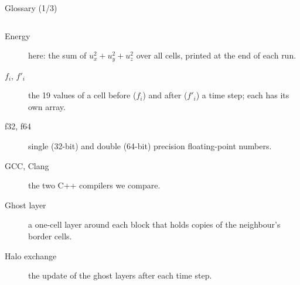 \documentclass[aspectratio=169,10pt,t]{beamer}
\begin{document}
\begin{frame}{Glossary (1/3)}
\begin{columns}[T,onlytextwidth]
\begin{description}
      \item[Energy] here: the sum of $u_x^2+u_y^2+u_z^2$ over all cells, printed at the end of each run.
      \item[$f_i$, $f'_i$] the 19 values of a cell before ($f_i$) and after ($f'_i$) a time step; each has its own array.
      \item[f32, f64] single (32-bit) and double (64-bit) precision floating-point numbers.
      \item[GCC, Clang] the two C++ compilers we compare.
      \item[Ghost layer] a one-cell layer around each block that holds copies of the neighbour's border cells.
      \item[Halo exchange] the update of the ghost layers after each time step.
    \end{description}
  \end{columns}
\end{frame}
\end{document}
